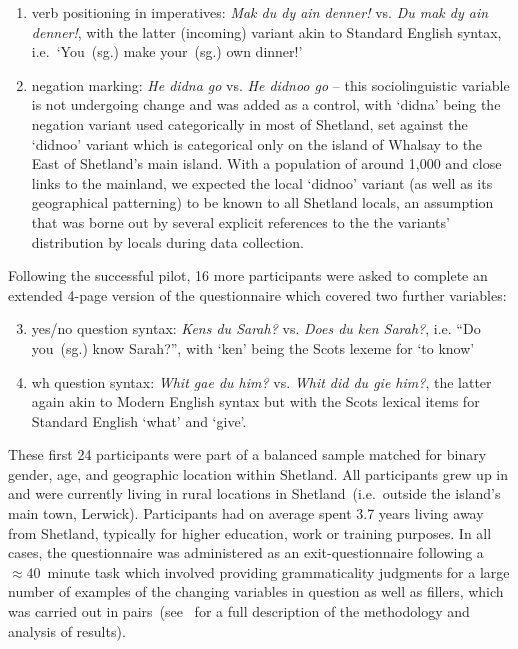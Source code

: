 \begin{enumerate}
\item verb positioning in imperatives: \emph{Mak du dy ain denner!} vs. \emph{Du mak dy ain denner!}, with the latter (incoming) variant akin to Standard English syntax, i.e.~`You~(sg.) make your~(sg.) own dinner!'
\item negation marking: \emph{He didna go} vs. \emph{He didnoo go} -- this sociolinguistic variable is not undergoing change and was added as a control, with `didna' being the negation variant used categorically in most of Shetland, set against the `didnoo' variant which is categorical only on the island of Whalsay to the East of Shetland's main island. With a population of around 1,000 and close links to the mainland, we expected the local `didnoo' variant (as well as its geographical patterning) to be known to all Shetland locals, an assumption that was borne out by several explicit references to the the variants' distribution by locals during data collection. %
\end{enumerate}

Following the successful pilot, 16 more participants were asked to complete an extended 4-page version of the questionnaire which covered two further variables:

\begin{enumerate}
\setcounter{enumi}{2}
\item yes/no question syntax: \emph{Kens du Sarah?} vs. \emph{Does du ken Sarah?}, i.e. ``Do you~(sg.) know Sarah?'', with `ken' being the Scots lexeme for `to know'
\item wh question syntax: \emph{Whit gae du him?} vs. \emph{Whit did du gie him?}, the latter again akin to Modern English syntax but with the Scots lexical items for Standard English `what' and `give'.
\end{enumerate}

These first 24 participants were part of a balanced sample matched for binary gender, age, and geographic location within Shetland. All participants grew up in and were currently living in rural locations in Shetland~(i.e.~outside the island's main town, Lerwick). Participants had on average spent 3.7 years living away from Shetland, typically for higher education, work or training purposes. In all cases, the questionnaire was administered as an exit-questionnaire following a $\approx40$~minute task which involved providing grammaticality judgments for a large number of examples of the changing variables in question as well as fillers, which was carried out in pairs~(see~\citealt{Jamieson2015} for a full description of the methodology and analysis of results). %

